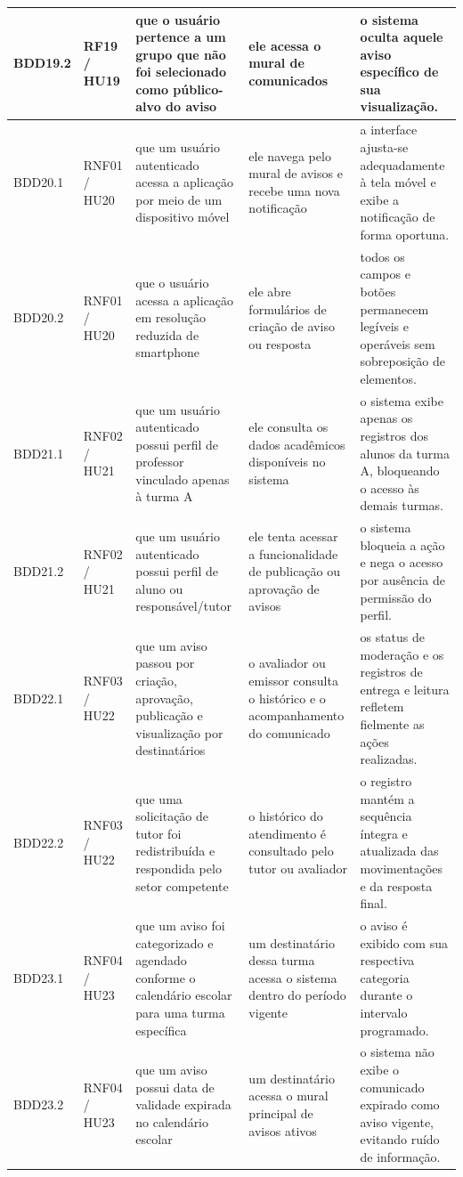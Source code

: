 \documentclass[a4paper,12pt]{report}
\begin{document}
\begin{longtable}{|p{1.6cm}|p{1.6cm}|p{3.6cm}|p{3.6cm}|p{4.0cm}|}
\hline
BDD19.2 & RF19 / HU19 & que o usuário pertence a um grupo que não foi selecionado como público-alvo do aviso & ele acessa o mural de comunicados & o sistema oculta aquele aviso específico de sua visualização. \\
\hline
BDD20.1 & RNF01 / HU20 & que um usuário autenticado acessa a aplicação por meio de um dispositivo móvel & ele navega pelo mural de avisos e recebe uma nova notificação & a interface ajusta-se adequadamente à tela móvel e exibe a notificação de forma oportuna. \\
\hline
BDD20.2 & RNF01 / HU20 & que o usuário acessa a aplicação em resolução reduzida de smartphone & ele abre formulários de criação de aviso ou resposta & todos os campos e botões permanecem legíveis e operáveis sem sobreposição de elementos. \\
\hline
BDD21.1 & RNF02 / HU21 & que um usuário autenticado possui perfil de professor vinculado apenas à turma A & ele consulta os dados acadêmicos disponíveis no sistema & o sistema exibe apenas os registros dos alunos da turma A, bloqueando o acesso às demais turmas. \\
\hline
BDD21.2 & RNF02 / HU21 & que um usuário autenticado possui perfil de aluno ou responsável/tutor & ele tenta acessar a funcionalidade de publicação ou aprovação de avisos & o sistema bloqueia a ação e nega o acesso por ausência de permissão do perfil. \\
\hline
BDD22.1 & RNF03 / HU22 & que um aviso passou por criação, aprovação, publicação e visualização por destinatários & o avaliador ou emissor consulta o histórico e o acompanhamento do comunicado & os status de moderação e os registros de entrega e leitura refletem fielmente as ações realizadas. \\
\hline
BDD22.2 & RNF03 / HU22 & que uma solicitação de tutor foi redistribuída e respondida pelo setor competente & o histórico do atendimento é consultado pelo tutor ou avaliador & o registro mantém a sequência íntegra e atualizada das movimentações e da resposta final. \\
\hline
BDD23.1 & RNF04 / HU23 & que um aviso foi categorizado e agendado conforme o calendário escolar para uma turma específica & um destinatário dessa turma acessa o sistema dentro do período vigente & o aviso é exibido com sua respectiva categoria durante o intervalo programado. \\
\hline
BDD23.2 & RNF04 / HU23 & que um aviso possui data de validade expirada no calendário escolar & um destinatário acessa o mural principal de avisos ativos & o sistema não exibe o comunicado expirado como aviso vigente, evitando ruído de informação. \\

\end{longtable}
\end{document}
